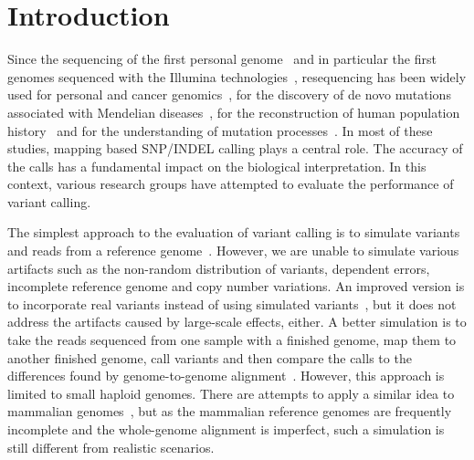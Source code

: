 \documentclass{bioinfo-ori}
\begin{document}
\section{Introduction}

Since the sequencing of the first personal genome~\citep{Levy:2007uq} and in
particular the first genomes sequenced with the Illumina
technologies~\citep{Bentley:2008cr,Wang:2008nx}, resequencing has been widely
used for personal and cancer genomics~\citep{Watson:2013aa}, for the discovery
of de novo mutations associated with Mendelian diseases~\citep{Bamshad:2011aa},
for the reconstruction of human population history~\citep{Li:2011ij} and for
the understanding of mutation processes~\citep{Veltman:2012aa,Campbell:2013aa}.
In most of these studies, mapping based SNP/INDEL calling plays a central role.
The accuracy of the calls has a fundamental impact on the biological
interpretation. In this context, various research groups have attempted to
evaluate the performance of variant calling.

The simplest approach to the evaluation of variant calling is to simulate
variants and reads from a reference genome~\citep{Li:2008zr}. However, we are
unable to simulate various artifacts such as the non-random distribution of
variants, dependent errors, incomplete reference genome and copy number
variations. An improved version is to incorporate real variants instead of
using simulated variants~\citep{Talwalkar:2013aa}, but it does not address the
artifacts caused by large-scale effects, either. A better simulation is to take
the reads sequenced from one sample with a finished genome, map them to another
finished genome, call variants and then compare the calls to the differences found by genome-to-genome
alignment~\citep{Li:2008zr}. However, this approach is limited to small haploid
genomes. There are attempts to apply a similar idea to mammalian
genomes~\citep{Li:2013ab,Bolosky:2014aa}, but as the mammalian reference
genomes are frequently incomplete and the whole-genome alignment is imperfect,
such a simulation is still different from realistic scenarios.
\end{document}
